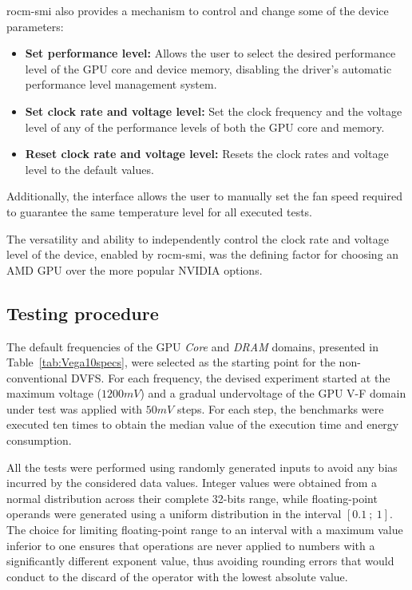 rocm-smi also provides a mechanism to control and change some of the device parameters:
\begin{itemize}
\item \textbf{Set performance level:} Allows the user to select the desired performance level of the GPU core and device memory, disabling the driver's automatic performance level management system.
\item \textbf{Set clock rate and voltage level:} Set the clock frequency and the voltage level of any of the performance levels of both the GPU core and memory. 
\item \textbf{Reset clock rate and voltage level:} Resets the clock rates and voltage level to the default values.
\end{itemize}

Additionally, the interface allows the user to manually set the fan speed required to guarantee the same temperature level for all executed tests.

The versatility and ability to independently control the clock rate and voltage level of the device, enabled by rocm-smi, was the defining factor for choosing an AMD GPU over the more popular NVIDIA options.


\subsection{Testing procedure}
\label{sec:ex_setup}

The default frequencies of the GPU \textit{Core} and \textit{DRAM} domains, presented in Table~\ref{tab:Vega10specs}, were selected as the starting point for the non-conventional DVFS. For each frequency, the devised experiment started at the maximum voltage ($1200mV$) and a gradual undervoltage of the GPU V-F domain under test was applied with $50mV$ steps. For each step, the benchmarks were executed ten times to obtain the median value of the execution time and energy consumption. 

All the tests were performed using randomly generated inputs to avoid any bias incurred by the considered data values. Integer values were obtained from a normal distribution across their complete 32-bits range, while floating-point operands were generated using a uniform distribution in the interval $[0.1~;~1]$. The choice for limiting floating-point range to an interval with a maximum value inferior to one ensures that operations are never applied to numbers with a significantly different exponent value, thus avoiding rounding errors that would conduct to the discard of the operator with the lowest absolute value.

